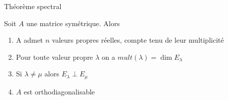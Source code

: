         \begin{parag}{Théorème spectral}
            \begin{theoreme}
                Soit $A$ une matrice symétrique. Alors
                \begin{enumerate}
                    \item A admet $n$ valeurs propres réelles, compte tenu de leur multiplicité
                    \item Pour toute valeur propre $\lambda$ on a $mult(\lambda) = \dim E_\lambda$
                    \item Si $\lambda \neq \mu$ alors $E_\lambda \perp E_\mu$
                    \item $A$ est orthodiagonalisable
                \end{enumerate}
            \end{theoreme}
        \end{parag}